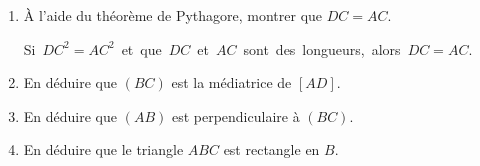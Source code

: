 \begin{activite}
    \begin{minipage}{0.3\linewidth}
    \end{minipage}
    \begin{minipage}{0.7\linewidth}        
        \begin{enumerate}
            \item À l'aide du théorème de Pythagore, montrer que $DC=AC$.
            
             \mbox{Si $DC^2=AC^2$ et que $DC$ et $AC$ sont des longueurs, alors $DC=AC$.}
            \item En déduire que $(BC)$ est la médiatrice de $[AD]$.
            \item En déduire que $(AB)$ est perpendiculaire à $(BC)$.
            \item En déduire que le triangle $ABC$ est rectangle en $B$.
        \end{enumerate}
    \end{minipage}


\end{activite}